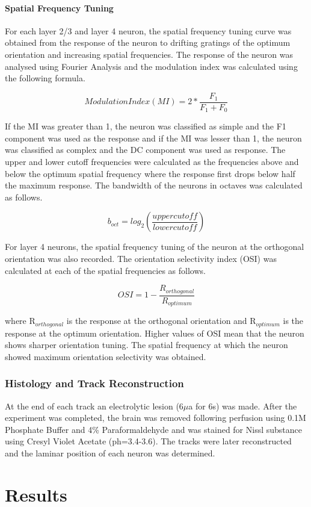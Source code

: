 \paragraph{Spatial Frequency Tuning}

For each layer 2/3 and layer 4 neuron, the spatial frequency tuning curve was obtained from the response of the neuron to drifting gratings of the optimum orientation and increasing spatial frequencies. The response of the neuron was analysed using Fourier Analysis and the modulation index was calculated using the following formula.

\[Modulation Index (MI)= 2*\frac{F_1}{F_1+F_0}\]

If the MI was greater than 1, the neuron was classified as simple and the F1 component was used as the response and if the MI was lesser than 1, the neuron was classified as complex and the DC component was used as response. The upper and lower cutoff frequencies were calculated as the frequencies above and below the optimum spatial frequency where the response first drops below half the maximum response.  The bandwidth of the neurons in octaves was calculated as follows.

\[b_{oct}= log_2(\frac{upper cutoff}{lower cutoff})\]

For layer 4 neurons, the spatial frequency tuning of the neuron at the orthogonal orientation was also recorded. The orientation selectivity index (OSI) was calculated at each of the spatial frequencies as follows.

\[OSI= 1-\frac{R_{orthogonal}}{R_{optimum}}\]

where R$_{orthogonal}$ is the response at the orthogonal orientation and R$_{optimum}$ is the response at the optimum orientation. Higher values of OSI mean that the neuron shows sharper orientation tuning. The spatial frequency at which the neuron showed maximum orientation selectivity was obtained.
\subsubsection{Histology and Track Reconstruction}

At the end of each track an electrolytic lesion (6$\mu$a for 6s) was made. After the experiment was completed, the brain was removed following perfusion using 0.1M Phosphate Buffer and 4\% Paraformaldehyde and was stained for Nissl substance using Cresyl Violet Acetate (ph=3.4-3.6). The tracks were later reconstructed and the laminar position of each neuron was determined.
\section{Results}

